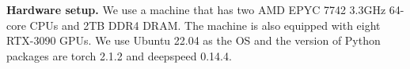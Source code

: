 \begin{comment}
\cancel{
For the comparisons, we use several instruction-tuned
models. 
We also utilize the Llama-3-8B model as the base model and
train it with 30,164 instructions, but they are generated 
using Self-Instruct. By comparing this model with our model, 
we can fairly and directly compare \ours{} with Self-Instruct.
We include a Llama-3-8B-Instruct as a baseline, and this model has 
conducted instruction tuning on the same base model as ours, but 
it was trained with 10M manually collected instructions. 
Also, this model has been trained with Reinforcement Learning with 
Human Feedback (RLHF)~\cite{rlhf} and supervised
fine-tuning (SFT)~\cite{sft1} to improve the model's 
performance further. This model can be considered the peak performance 
of an instruction-tuned model based on the Llama-3-8B model. By 
comparing this model with ours, we can assess how close we are to 
the peak performance.
Additionally, we evaluate other 7-8 B-sized models, including 
Falcon-7B-Instruct and Gemma-7B-Instruct,
to show the standing of our models. 
For detailed information on the models, please refer to Appendix
}
\end{comment}

\noindent \textbf{Hardware setup.} 
We use a machine that has two AMD EPYC 7742 3.3GHz
64-core CPUs and 2TB DDR4 DRAM. The machine is also equipped with eight RTX-3090
GPUs.
We use Ubuntu 22.04 as the OS and the version of
Python packages are torch 2.1.2 and deepspeed 0.14.4.
\begin{comment}
Additionally, we adjusted the training datasets to evaluate
how well the models performed on specific tasks. This involved modifying the
prompts used for few-shot learning. The details of the modified prompts can be
found in the Appendix.
\end{comment}

